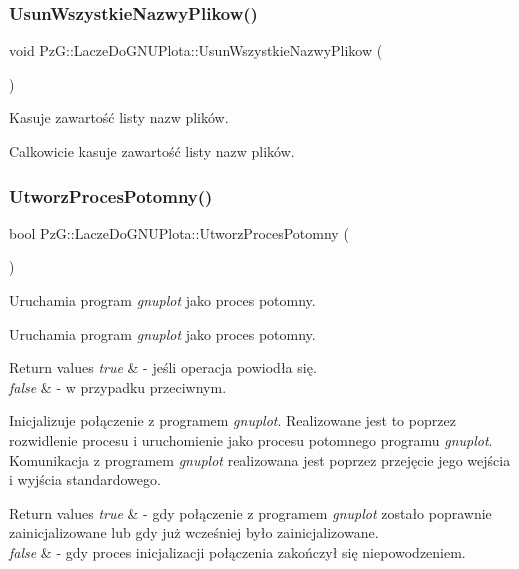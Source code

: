 \subsubsection{\texorpdfstring{UsunWszystkieNazwyPlikow()}{UsunWszystkieNazwyPlikow()}}
{\footnotesize\ttfamily void Pz\+G\+::\+Lacze\+Do\+G\+N\+U\+Plota\+::\+Usun\+Wszystkie\+Nazwy\+Plikow (\begin{DoxyParamCaption}{ }\end{DoxyParamCaption})}



Kasuje zawartość listy nazw plików. 

Calkowicie kasuje zawartość listy nazw plików. \mbox{\label{class_pz_g_1_1_lacze_do_g_n_u_plota_a1c7b9acc40de8d8bbb40fb0722512933}} 
\subsubsection{\texorpdfstring{UtworzProcesPotomny()}{UtworzProcesPotomny()}}
{\footnotesize\ttfamily bool Pz\+G\+::\+Lacze\+Do\+G\+N\+U\+Plota\+::\+Utworz\+Proces\+Potomny (\begin{DoxyParamCaption}{ }\end{DoxyParamCaption})\hspace{0.3cm}{\ttfamily [protected]}}



Uruchamia program {\itshape gnuplot} jako proces potomny. 

Uruchamia program {\itshape gnuplot} jako proces potomny. 
\begin{DoxyRetVals}{Return values}
{\em true} & -\/ jeśli operacja powiodła się. \\
\hline
{\em false} & -\/ w przypadku przeciwnym.\\
\hline
\end{DoxyRetVals}
Inicjalizuje połączenie z programem {\itshape gnuplot}. Realizowane jest to poprzez rozwidlenie procesu i uruchomienie jako procesu potomnego programu {\itshape gnuplot}. Komunikacja z programem {\itshape gnuplot} realizowana jest poprzez przejęcie jego wejścia i wyjścia standardowego.


\begin{DoxyRetVals}{Return values}
{\em true} & -\/ gdy połączenie z programem {\itshape gnuplot} zostało poprawnie zainicjalizowane lub gdy już wcześniej było zainicjalizowane. \\
\hline
{\em false} & -\/ gdy proces inicjalizacji połączenia zakończył się niepowodzeniem. \\
\hline
\end{DoxyRetVals}
\mbox{\label{class_pz_g_1_1_lacze_do_g_n_u_plota_ae2fbf0d8f3f248f750804cec606a7983}} 
